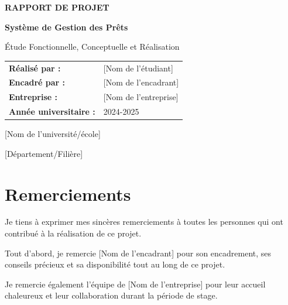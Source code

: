 \documentclass[12pt,a4paper]{report}
\begin{document}
\begin{titlepage}
\centering
\vspace*{2cm}

{\huge\bfseries RAPPORT DE PROJET}

\vspace{1.5cm}

{\Large\bfseries Système de Gestion des Prêts}

\vspace{1cm}

{\large Étude Fonctionnelle, Conceptuelle et Réalisation}

\vspace{3cm}

\begin{tabular}{ll}
\textbf{Réalisé par :} & [Nom de l'étudiant] \\[0.5cm]
\textbf{Encadré par :} & [Nom de l'encadrant] \\[0.5cm]
\textbf{Entreprise :} & [Nom de l'entreprise] \\[0.5cm]
\textbf{Année universitaire :} & 2024-2025 \\
\end{tabular}

\vfill

{\large [Nom de l'université/école]}

{\large [Département/Filière]}

\end{titlepage}

\tableofcontents
\newpage

\listoffigures
\newpage

\listoftables
\newpage

\chapter*{Remerciements}

Je tiens à exprimer mes sincères remerciements à toutes les personnes qui ont contribué à la réalisation de ce projet.

Tout d'abord, je remercie [Nom de l'encadrant] pour son encadrement, ses conseils précieux et sa disponibilité tout au long de ce projet.

Je remercie également l'équipe de [Nom de l'entreprise] pour leur accueil chaleureux et leur collaboration durant la période de stage.
\end{document}
